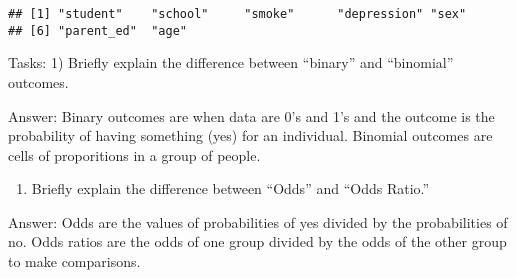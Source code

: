 \documentclass[]{article}
\newenvironment{Shaded}{\begin{snugshade}}{\end{snugshade}}
\newcommand{\DataTypeTok}[1]{\textcolor[rgb]{0.13,0.29,0.53}{#1}}
\newcommand{\DecValTok}[1]{\textcolor[rgb]{0.00,0.00,0.81}{#1}}
\newcommand{\KeywordTok}[1]{\textcolor[rgb]{0.13,0.29,0.53}{\textbf{#1}}}
\newcommand{\NormalTok}[1]{#1}
\newcommand{\OperatorTok}[1]{\textcolor[rgb]{0.81,0.36,0.00}{\textbf{#1}}}
\newcommand{\StringTok}[1]{\textcolor[rgb]{0.31,0.60,0.02}{#1}}
\providecommand{\tightlist}{%
  \setlength{\itemsep}{0pt}\setlength{\parskip}{0pt}}
\begin{document}
\begin{Shaded}
\end{Shaded}

\begin{verbatim}
## [1] "student"    "school"     "smoke"      "depression" "sex"       
## [6] "parent_ed"  "age"
\end{verbatim}

Tasks: 1) Briefly explain the difference between ``binary'' and
``binomial'' outcomes.

Answer: Binary outcomes are when data are 0's and 1's and the outcome is
the probability of having something (yes) for an individual. Binomial
outcomes are cells of proporitions in a group of people.

\begin{enumerate}
\def\labelenumi{\arabic{enumi})}
\setcounter{enumi}{1}
\tightlist
\item
  Briefly explain the difference between ``Odds'' and ``Odds Ratio.''
\end{enumerate}

Answer: Odds are the values of probabilities of yes divided by the
probabilities of no. Odds ratios are the odds of one group divided by
the odds of the other group to make comparisons.
\end{document}
